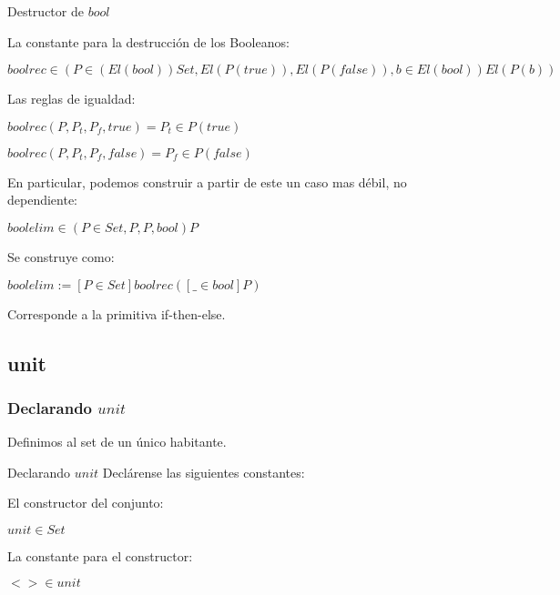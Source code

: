 \documentclass{beamer}
\begin{document}
\begin{frame}{Destructor de $bool$}
   
  La constante para la destrucci\'on de los Booleanos:

   
  \begin{center}
    $boolrec \in (P \in (El(bool))Set, El(P(true)),El(P(false)),
    b \in El(bool)) El(P(b))$
  \end{center}


  Las reglas de igualdad:

  \begin{center}
    $boolrec(P,P_t,P_f,true) = P_t \in P(true)$
    
    $boolrec(P,P_t,P_f,false) = P_f \in P(false)$
  \end{center}
  
 
\end{frame}


\begin{frame}

  En particular, podemos construir a partir de este
  un caso mas d\'ebil, no dependiente:

  \begin{center}
    $boolelim \in (P \in Set, P , P, bool) P $
  \end{center}

  \pause

  Se construye como:

  \begin{center}
    $boolelim := [P \in Set] boolrec ([\_\in bool] P)$
  \end{center}

  \pause

  Corresponde a la primitiva if-then-else.
  
\end{frame}


\subsection{unit}
\begin{frame}\frametitle{Declarando $unit$}
  Definimos al set de un \'unico habitante.
  \pause

\end{frame}

\begin{frame}{Declarando $unit$}
  Decl\'arense las siguientes constantes:\\

  \pause

  El constructor del conjunto:
  
  \pause
  \begin{center}
    $unit \in Set$
  \end{center}
  \pause
  
  La constante para el constructor:
  
  \pause

  \begin{center}
    
    $<> \in unit$
 
  \end{center}
  
\end{frame}
\end{document}
